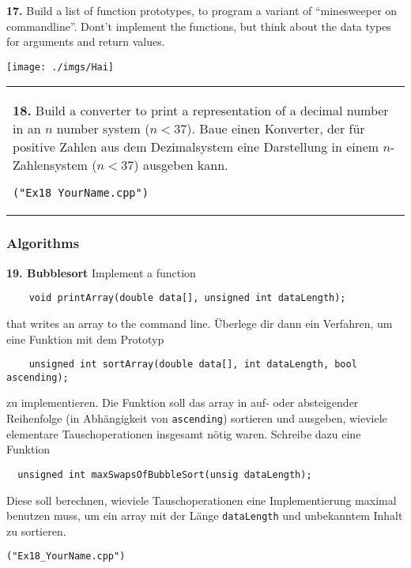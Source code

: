 \documentclass[paper=A4, pagesize, DIV=calc, smallheadings,
fontsize=11pt, expansion=false]{scrreprt}
\begin{document}
\textbf{17.} Build a list of function prototypes, to program a variant of ``minesweeper on commandline''. 
Dont't implement the functions, but think about the data types for arguments and return values.\\

\begin{minipage}[H]{0.3\linewidth}
  \texttt{[image: ./imgs/Hai]}
\end{minipage}
\begin{tabular}{m{30em}}
  \textbf{18.}
Build a converter to print a representation of a decimal number in an $n$ number system ($n < 37$).
 Baue einen Konverter, der für positive Zahlen aus dem Dezimalsystem eine Darstellung in einem $n$-Zahlensystem ($n < 37$) ausgeben kann.
\begin{verbatim}
("Ex18_YourName.cpp")
\end{verbatim}
\end{tabular}






\newpage
\subsubsection{Algorithms}
\textbf{19. Bubblesort}
Implement a function
\begin{verbatim}
    void printArray(double data[], unsigned int dataLength);
\end{verbatim}
that writes an array to the command line.
Überlege dir dann ein Verfahren, um eine Funktion mit dem Prototyp
\begin{verbatim}
    unsigned int sortArray(double data[], int dataLength, bool ascending);
\end{verbatim}    
zu implementieren.
  Die Funktion soll das array in auf- oder absteigender Reihenfolge (in Abhängigkeit von \texttt{ascending}) sortieren und ausgeben, wieviele elementare Tauschoperationen insgesamt nötig waren.
  Schreibe dazu eine Funktion
\begin{verbatim}
  unsigned int maxSwapsOfBubbleSort(unsig dataLength);
\end{verbatim}
  Diese soll berechnen, wieviele Tauschoperationen eine Implementierung maximal benutzen muss, um ein array mit der Länge \texttt{dataLength} und unbekanntem Inhalt zu sortieren.

\begin{verbatim}
("Ex18_YourName.cpp")
\end{verbatim}
\end{document}
